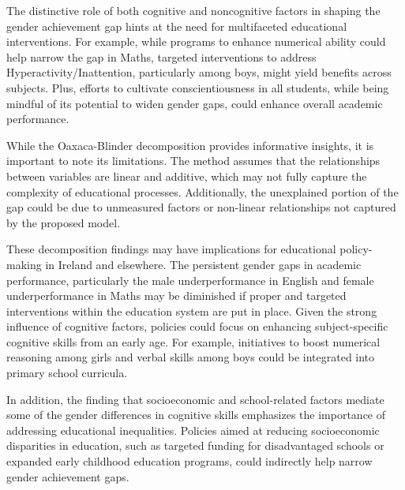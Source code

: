 \documentclass[12pt,a4paper,onecolumn]{article}
\numberwithin{equation}{section}
\begin{document}
The distinctive role of both cognitive and noncognitive factors in shaping the gender achievement gap hints at the need for multifaceted educational interventions. For example, while programs to enhance numerical ability could help narrow the gap in Maths, targeted interventions to address Hyperactivity/Inattention, particularly among boys, might yield benefits across subjects. Plus, efforts to cultivate conscientiousness in all students, while being mindful of its potential to widen gender gaps, could enhance overall academic performance.

While the Oaxaca-Blinder decomposition provides informative insights, it is important to note its limitations. The method assumes that the relationships between variables are linear and additive, which may not fully capture the complexity of educational processes. Additionally, the unexplained portion of the gap could be due to unmeasured factors or non-linear relationships not captured by the proposed model. 

These decomposition findings may have implications for educational policy-making in Ireland and elsewhere. The persistent gender gaps in academic performance, particularly the male underperformance in English and female underperformance in Maths may be diminished if proper and targeted interventions within the education system are put in place. Given the strong influence of cognitive factors, policies could focus on enhancing subject-specific cognitive skills from an early age. For example, initiatives to boost numerical reasoning among girls and verbal skills among boys could be integrated into primary school curricula.

In addition, the finding that socioeconomic and school-related factors mediate some of the gender differences in cognitive skills emphasizes the importance of addressing educational inequalities. Policies aimed at reducing socioeconomic disparities in education, such as targeted funding for disadvantaged schools or expanded early childhood education programs, could indirectly help narrow gender achievement gaps.
\end{document}
